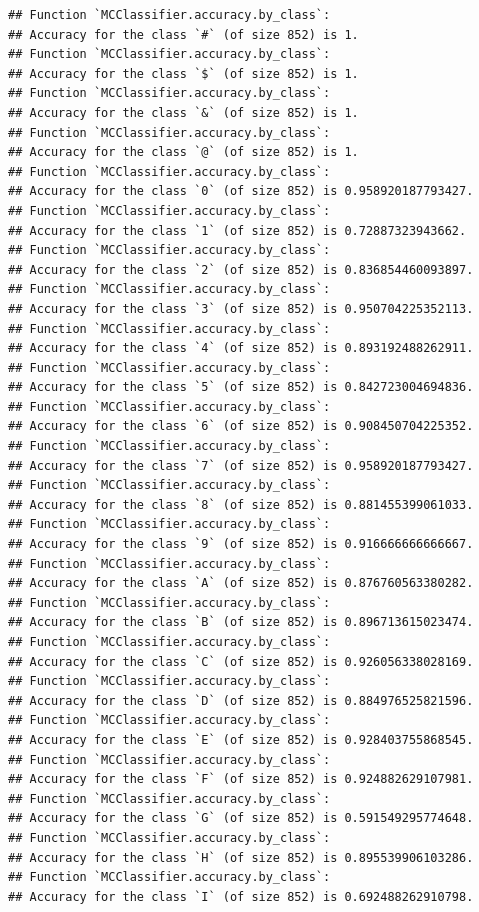 \documentclass[
]{report}
\begin{document}
\footnotesize

\begin{verbatim}
## Function `MCClassifier.accuracy.by_class`:
## Accuracy for the class `#` (of size 852) is 1.
## Function `MCClassifier.accuracy.by_class`:
## Accuracy for the class `$` (of size 852) is 1.
## Function `MCClassifier.accuracy.by_class`:
## Accuracy for the class `&` (of size 852) is 1.
## Function `MCClassifier.accuracy.by_class`:
## Accuracy for the class `@` (of size 852) is 1.
## Function `MCClassifier.accuracy.by_class`:
## Accuracy for the class `0` (of size 852) is 0.958920187793427.
## Function `MCClassifier.accuracy.by_class`:
## Accuracy for the class `1` (of size 852) is 0.72887323943662.
## Function `MCClassifier.accuracy.by_class`:
## Accuracy for the class `2` (of size 852) is 0.836854460093897.
## Function `MCClassifier.accuracy.by_class`:
## Accuracy for the class `3` (of size 852) is 0.950704225352113.
## Function `MCClassifier.accuracy.by_class`:
## Accuracy for the class `4` (of size 852) is 0.893192488262911.
## Function `MCClassifier.accuracy.by_class`:
## Accuracy for the class `5` (of size 852) is 0.842723004694836.
## Function `MCClassifier.accuracy.by_class`:
## Accuracy for the class `6` (of size 852) is 0.908450704225352.
## Function `MCClassifier.accuracy.by_class`:
## Accuracy for the class `7` (of size 852) is 0.958920187793427.
## Function `MCClassifier.accuracy.by_class`:
## Accuracy for the class `8` (of size 852) is 0.881455399061033.
## Function `MCClassifier.accuracy.by_class`:
## Accuracy for the class `9` (of size 852) is 0.916666666666667.
## Function `MCClassifier.accuracy.by_class`:
## Accuracy for the class `A` (of size 852) is 0.876760563380282.
## Function `MCClassifier.accuracy.by_class`:
## Accuracy for the class `B` (of size 852) is 0.896713615023474.
## Function `MCClassifier.accuracy.by_class`:
## Accuracy for the class `C` (of size 852) is 0.926056338028169.
## Function `MCClassifier.accuracy.by_class`:
## Accuracy for the class `D` (of size 852) is 0.884976525821596.
## Function `MCClassifier.accuracy.by_class`:
## Accuracy for the class `E` (of size 852) is 0.928403755868545.
## Function `MCClassifier.accuracy.by_class`:
## Accuracy for the class `F` (of size 852) is 0.924882629107981.
## Function `MCClassifier.accuracy.by_class`:
## Accuracy for the class `G` (of size 852) is 0.591549295774648.
## Function `MCClassifier.accuracy.by_class`:
## Accuracy for the class `H` (of size 852) is 0.895539906103286.
## Function `MCClassifier.accuracy.by_class`:
## Accuracy for the class `I` (of size 852) is 0.692488262910798.

\end{verbatim}
\end{document}
